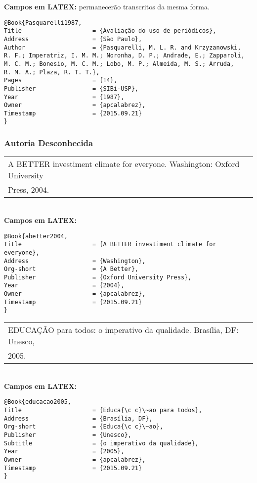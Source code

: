\textbf{Campos em LATEX:} permanecerão transcritos da mesma forma.\\

\begin{verbatim}
@Book{Pasquarelli1987,
Title                    = {Avaliação do uso de periódicos},
Address                  = {São Paulo},
Author                   = {Pasquarelli, M. L. R. and Krzyzanowski,
R. F.; Imperatriz, I. M. M.; Noronha, D. P.; Andrade, E.; Zapparoli,
M. C. M.; Bonesio, M. C. M.; Lobo, M. P.; Almeida, M. S.; Arruda, 
R. M. A.; Plaza, R. T. T.},
Pages                    = {14},
Publisher                = {SIBi-USP},
Year                     = {1987},
Owner                    = {apcalabrez},
Timestamp                = {2015.09.21}
}
\end{verbatim}

\subsubsection{Autoria Desconhecida}

\begin{tabular}{|l|c|} \hline
A BETTER investiment climate for everyone. Washington: Oxford University \\ Press, 2004.\\\hline
\end{tabular}\\

\textbf{Campos em LATEX:}

\begin{verbatim}
@Book{abetter2004,
Title                    = {A BETTER investiment climate for everyone},
Address                  = {Washington},
Org-short                = {A Better},
Publisher                = {Oxford University Press},
Year                     = {2004},
Owner                    = {apcalabrez},
Timestamp                = {2015.09.21}
}
\end{verbatim}

\begin{tabular}{|l|c|} \hline
EDUCAÇÃO para todos: o imperativo da qualidade. Brasília, DF: Unesco,\\ 2005.\\\hline
\end{tabular}\\

\textbf{Campos em LATEX:}

\begin{verbatim}
@Book{educacao2005,
Title                    = {Educa{\c c}\~ao para todos},
Address                  = {Brasília, DF},
Org-short                = {Educa{\c c}\~ao},
Publisher                = {Unesco},
Subtitle                 = {o imperativo da qualidade},
Year                     = {2005},
Owner                    = {apcalabrez},
Timestamp                = {2015.09.21}
}
\end{verbatim}

